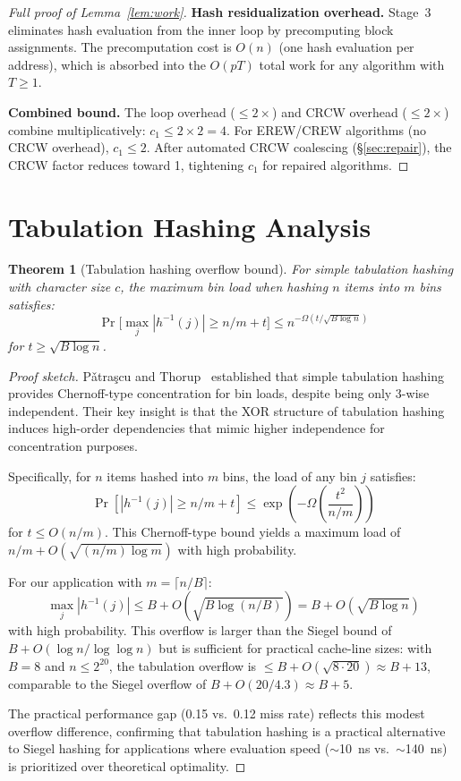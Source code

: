 \documentclass[11pt]{article}
\newtheorem{theorem}{Theorem}
\begin{document}
\begin{proof}[Full proof of Lemma~\ref{lem:work}]
\textbf{Hash residualization overhead.}
Stage~3 eliminates hash evaluation from the inner loop by precomputing
block assignments.  The precomputation cost is $O(n)$ (one hash evaluation
per address), which is absorbed into the $O(pT)$ total work for any
algorithm with $T \ge 1$.

\textbf{Combined bound.}
The loop overhead ($\le 2\times$) and CRCW overhead ($\le 2\times$) combine
multiplicatively: $c_1 \le 2 \times 2 = 4$.  For EREW/CREW algorithms
(no CRCW overhead), $c_1 \le 2$.  After automated CRCW coalescing
(\S\ref{sec:repair}), the CRCW factor reduces toward 1, tightening $c_1$
for repaired algorithms.
\end{proof}

\section{Tabulation Hashing Analysis}
\label{app:tabulation}

\begin{theorem}[Tabulation hashing overflow bound]
\label{thm:tabulation}
For simple tabulation hashing with character size $c$, the maximum bin
load when hashing $n$ items into $m$ bins satisfies:
\[
  \Pr\bigl[\max_j |h^{-1}(j)| \ge n/m + t\bigr] \le
  n^{-\Omega(t / \sqrt{B \log n})}
\]
for $t \ge \sqrt{B \log n}$.
\end{theorem}

\begin{proof}[Proof sketch]
P\v{a}tra\c{s}cu and Thorup~\cite{patrascu2012power} established that
simple tabulation hashing provides Chernoff-type concentration for bin
loads, despite being only 3-wise independent.  Their key insight is that
the XOR structure of tabulation hashing induces high-order dependencies
that mimic higher independence for concentration purposes.

Specifically, for $n$ items hashed into $m$ bins, the load of any bin $j$
satisfies:
\[
  \Pr[|h^{-1}(j)| \ge n/m + t] \le \exp\left(-\Omega\left(\frac{t^2}{n/m}\right)\right)
\]
for $t \le O(n/m)$.  This Chernoff-type bound yields a maximum load of
$n/m + O(\sqrt{(n/m) \log m})$ with high probability.

For our application with $m = \lceil n/B \rceil$:
\[
  \max_j |h^{-1}(j)| \le B + O(\sqrt{B \log(n/B)})
    = B + O(\sqrt{B \log n})
\]
with high probability.  This overflow is larger than the Siegel bound of
$B + O(\log n / \log\log n)$ but is sufficient for practical cache-line
sizes: with $B = 8$ and $n \le 2^{20}$, the tabulation overflow is
$\le B + O(\sqrt{8 \cdot 20}) \approx B + 13$, comparable to the Siegel
overflow of $B + O(20/4.3) \approx B + 5$.

The practical performance gap (0.15 vs.\ 0.12 miss rate) reflects this
modest overflow difference, confirming that tabulation hashing is a
practical alternative to Siegel hashing for applications where evaluation
speed ($\sim$10~ns vs.\ $\sim$140~ns) is prioritized over theoretical
optimality.
\end{proof}
\end{document}
